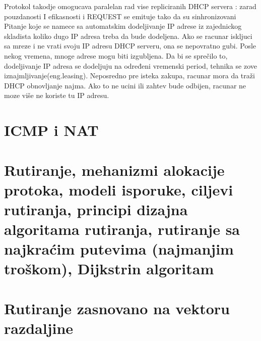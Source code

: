 \documentclass{article} %
\begin{document}
Protokol takodje omogucava paralelan rad vise repliciranih DHCP servera :
zarad pouzdanosti I efikasnosti i REQUEST se emituje tako da su sinhronizovani\\
Pitanje koje se namece sa automatskim dodeljivanje IP adrese iz zajednickog skladista koliko dugo IP adresa treba da bude dodeljena. Ako se racunar iskljuci sa  mreze i ne vrati svoju IP adresu DHCP serveru, ona se nepovratno gubi. Posle nekog vremena, mnoge adrese mogu biti izgubljena. Da bi se  sprečilo to, dodeljivanje IP adresa se dodeljuju na određeni vremenski period, tehnika se zove iznajmljivanje(eng.leasing). Neposredno pre isteka zakupa, racunar mora da traži DHCP obnovljanje najma. Ako to ne ucini ili zahtev bude odbijen, racunar ne  moze  više ne koriste tu IP adresu.
\section{ICMP i NAT}
\section{Rutiranje, mehanizmi alokacije protoka, modeli isporuke, ciljevi rutiranja, principi dizajna algoritama rutiranja, rutiranje sa najkraćim putevima (najmanjim troškom), Dijkstrin algoritam}
\section{Rutiranje zasnovano na vektoru razdaljine}
\end{document}
